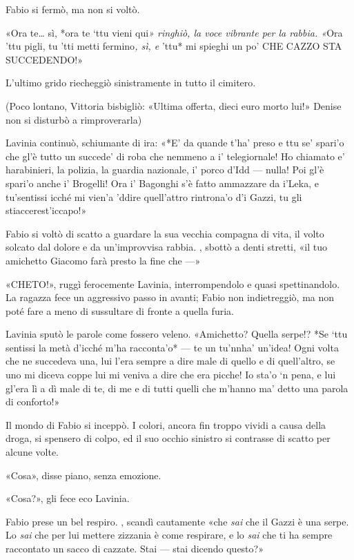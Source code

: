 Fabio si fermò, ma non si voltò.

«Ora te\ldots{} sì, *ora te `ttu vieni qui\emph{»
ringhiò, la voce vibrante per la rabbia. «}Ora 'ttu pigli, tu
'tti metti fermino\emph{, sì, e }'ttu* mi spieghi un po' CHE CAZZO STA
SUCCEDENDO!»

L'ultimo grido riecheggiò sinistramente in tutto il cimitero.

(Poco lontano, Vittoria bisbigliò: «Ultima offerta, dieci euro
morto lui!» Denise non si disturbò a rimproverarla)

Lavinia continuò, schiumante di ira: «*E' da quande t'ha'
preso e ttu se' spari'o che gl'è tutto un succede' di roba che nemmeno a
i' telegiornale! Ho chiamato e' harabinieri, la polizia, la guardia
nazionale, i' porco d'Idd --- nulla! Poi gl'è spari'o anche i' Brogelli!
Ora i' Bagonghi s'è fatto ammazzare da i'Leka, e tu'sentissi icché mi
vien'a 'ddire quell'attro rintrona'o d'i Gazzi, tu gli
stiaccerest'iccapo!»

Fabio si voltò di scatto a guardare la sua vecchia compagna di vita, il
volto solcato dal dolore e da un'improvvisa rabbia. , sbottò a denti
stretti, «il tuo amichetto Giacomo farà presto la fine che
---»

«CHETO!», ruggì ferocemente Lavinia,
interrompendolo e quasi spettinandolo. La ragazza fece un aggressivo
passo in avanti; Fabio non indietreggiò, ma non poté fare a meno di
sussultare di fronte a quella furia.

Lavinia sputò le parole come fossero veleno. «Amichetto?
Quella serpe!? *Se `ttu sentissi la metà d'icché m'ha racconta'o* --- te
un tu'nnha' un'idea! Ogni volta che ne succedeva una, lui l'era sempre a
dire male di quello e di quell'altro, se uno mi diceva coppe lui mi
veniva a dire che era picche! Io sta'o `n pena, e lui gl'era lì a dì
male di te, di me e di tutti quelli che m'hanno ma' detto una parola di
conforto!»

Il mondo di Fabio si inceppò. I colori, ancora fin troppo vividi a causa
della droga, si spensero di colpo, ed il suo occhio sinistro si
contrasse di scatto per alcune volte.

«Cosa», disse piano, senza emozione.

«Cosa?», gli fece eco Lavinia.

Fabio prese un bel respiro. , scandì cautamente «che
\emph{sai} che il Gazzi è una serpe. Lo \emph{sai} che per lui mettere
zizzania è come respirare, e lo \emph{sai} che ti ha sempre raccontato
un sacco di cazzate. Stai --- stai dicendo questo?»

